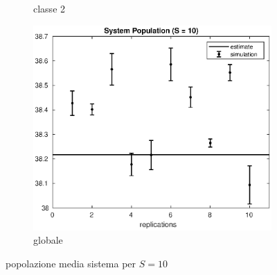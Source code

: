 \begin{figure}[!h]
\begin{subfigure}[t]{0.49\textwidth}
\caption{classe 2}
\label{10_n2}
\end{subfigure}
%
\begin{subfigure}[t]{0.5\textwidth}
\includegraphics[width=\textwidth]{figures/simul/10_500K_n}
\caption{globale}
\label{10_n}
\end{subfigure}
%
\caption{popolazione media sistema per $S = 10$}
\end{figure}
%


